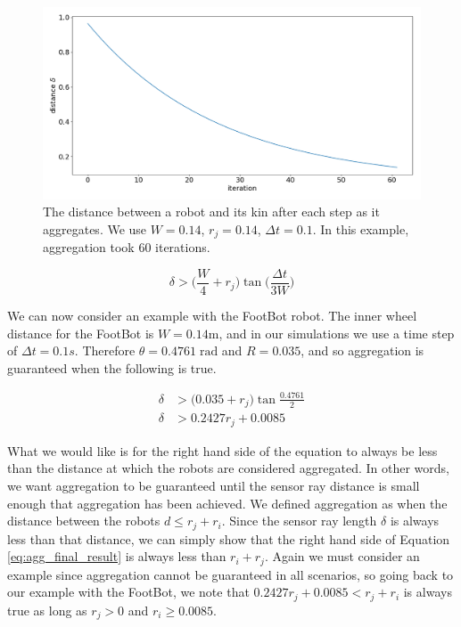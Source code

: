 \documentclass[conference]{IEEEtran}
\begin{document}
    \begin{figure}
      \centering
      \includegraphics[width=1\linewidth]{./images/dist_plot.png}
      \caption{The distance between a robot and its kin after each step as it aggregates. We use $W=0.14$, $r_j=0.14$, $\Delta t=0.1$. In this example, aggregation took 60 iterations.}
      \label{fig:dist_plot}
    \end{figure}

    \begin{equation}
      \label{eq:agg_final_result}
      \delta > \bigg(\frac{W}{4} + r_j\bigg)\tan\bigg(\frac{\Delta t}{3W}\bigg)
    \end{equation}

    We can now consider an example with the FootBot robot. The inner wheel distance for the FootBot is $W=0.14$m, and in our simulations we use a time step of $\Delta t = 0.1s$. Therefore $\theta = 0.4761\;\text{rad}$ and $R=0.035$, and so aggregation is guaranteed when the following is true.

    \begin{equation} \label{eq:khephera_agg}
      \begin{split}
        \delta &> \bigg(0.035 + r_j\bigg)\tan\frac{0.4761}{2} \\
        \delta &> 0.2427 r_j + 0.0085
      \end{split}
    \end{equation}

     What we would like is for the right hand side of the equation to always be less than the distance at which the robots are considered aggregated. In other words, we want aggregation to be guaranteed until the sensor ray distance is small enough that aggregation has been achieved. We defined aggregation as when the distance between the robots $d \leq r_j+r_i$. Since the sensor ray length $\delta$ is always less than that distance, we can simply show that the right hand side of Equation \ref{eq:agg_final_result} is always less than $r_i+r_j$. Again we must consider an example since aggregation cannot be guaranteed in all scenarios, so going back to our example with the FootBot, we note that $0.2427r_j + 0.0085 < r_j+r_i$ is always true as long as $r_j>0$ and $r_i\geq0.0085$.
\end{document}

